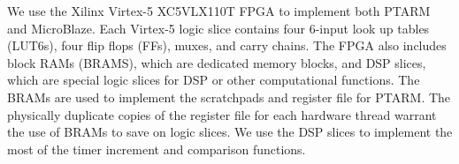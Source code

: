 We use the Xilinx Virtex-5 XC5VLX110T FPGA to implement both PTARM and MicroBlaze.
Each Virtex-5 logic slice contains four 6-input look up tables (LUT6s), four flip flops (FFs), muxes, and carry chains.
The FPGA also includes block RAMs (BRAMS), which are dedicated memory blocks, and DSP slices, which are special logic slices for DSP or other computational functions.
The BRAMs are used to implement the scratchpads and register file for PTARM. 
The physically duplicate copies of the register file for each hardware thread warrant the use of BRAMs to save on logic slices.
We use the DSP slices to implement the most of the timer increment and comparison functions.

\begin{table}[h]
\vspace{-5pt}
\noindent{}
\end{table}
